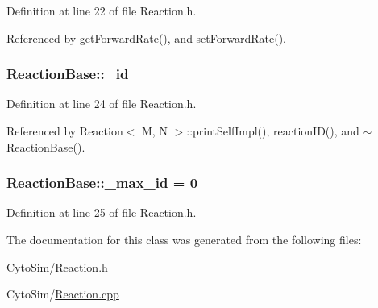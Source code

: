 Definition at line 22 of file Reaction.\-h.



Referenced by get\-Forward\-Rate(), and set\-Forward\-Rate().

\hypertarget{classReactionBase_ae2f1e83b7b64bb2d53b4f9533a5c5741}{
\subsubsection[{\-\_\-id}]{ {\bf Reaction\-Base\-::\-\_\-id}}}\label{classReactionBase_ae2f1e83b7b64bb2d53b4f9533a5c5741}


Definition at line 24 of file Reaction.\-h.



Referenced by Reaction$<$ M, N $>$\-::print\-Self\-Impl(), reaction\-I\-D(), and $\sim$\-Reaction\-Base().

\hypertarget{classReactionBase_aaf6c18537d4ae9f89a83e2d7041aeb26}{
\subsubsection[{\-\_\-max\-\_\-id}]{ {\bf Reaction\-Base\-::\-\_\-max\-\_\-id} = 0}}\label{classReactionBase_aaf6c18537d4ae9f89a83e2d7041aeb26}


Definition at line 25 of file Reaction.\-h.



The documentation for this class was generated from the following files\-:\begin{DoxyCompactItemize}
\item 
Cyto\-Sim/\hyperlink{Reaction_8h}{Reaction.\-h}\item 
Cyto\-Sim/\hyperlink{Reaction_8cpp}{Reaction.\-cpp}\end{DoxyCompactItemize}
